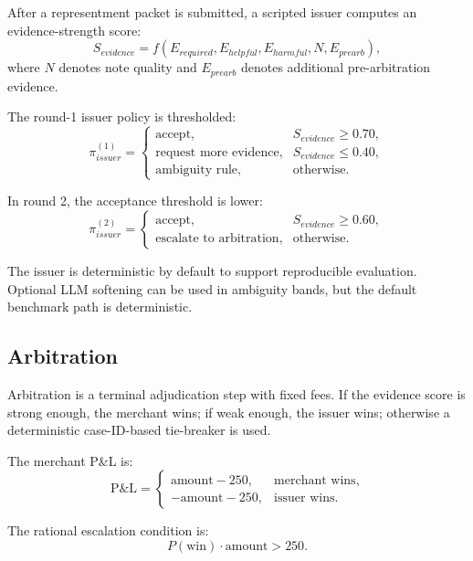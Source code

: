 \documentclass[11pt]{article}
\begin{document}
After a representment packet is submitted, a scripted issuer computes an evidence-strength score:
\begin{equation}
    S_{evidence} = f(E_{required}, E_{helpful}, E_{harmful}, N, E_{prearb}),
\end{equation}
where $N$ denotes note quality and $E_{prearb}$ denotes additional pre-arbitration evidence.

The round-1 issuer policy is thresholded:
\begin{equation}
\pi_{issuer}^{(1)} =
\begin{cases}
\text{accept}, & S_{evidence} \geq 0.70, \\
\text{request more evidence}, & S_{evidence} \leq 0.40, \\
\text{ambiguity rule}, & \text{otherwise}.
\end{cases}
\end{equation}

In round 2, the acceptance threshold is lower:
\begin{equation}
\pi_{issuer}^{(2)} =
\begin{cases}
\text{accept}, & S_{evidence} \geq 0.60, \\
\text{escalate to arbitration}, & \text{otherwise}.
\end{cases}
\end{equation}

The issuer is deterministic by default to support reproducible evaluation. Optional LLM softening can be used in ambiguity bands, but the default benchmark path is deterministic.

\subsection{Arbitration}

Arbitration is a terminal adjudication step with fixed fees. If the evidence score is strong enough, the merchant wins; if weak enough, the issuer wins; otherwise a deterministic case-ID-based tie-breaker is used.

The merchant P\&L is:
\begin{equation}
\text{P\&L} =
\begin{cases}
\text{amount} - 250, & \text{merchant wins}, \\
-\text{amount} - 250, & \text{issuer wins}.
\end{cases}
\end{equation}

The rational escalation condition is:
\begin{equation}
    P(\text{win}) \cdot \text{amount} > 250.
\end{equation}
\end{document}
